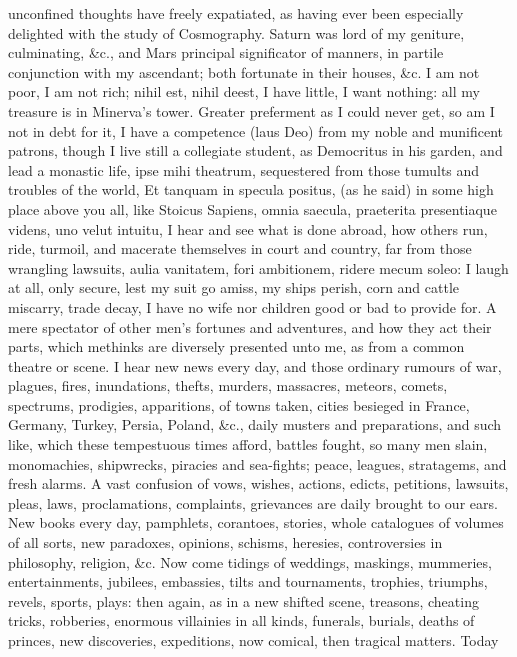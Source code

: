 {unconfined thoughts have freely expatiated, as having ever been
especially delighted with the study of Cosmography. Saturn was lord
of my geniture, culminating, \&c., and Mars principal significator of
manners, in partile conjunction with my ascendant; both fortunate in
their houses, \&c. I am not poor, I am not rich; nihil est, nihil deest,
I have little, I want nothing: all my treasure is in Minerva's tower.
Greater preferment as I could never get, so am I not in debt for it, I
have a competence (laus Deo) from my noble and munificent patrons,
though I live still a collegiate student, as Democritus in his garden,
and lead a monastic life, ipse mihi theatrum, sequestered from those
tumults and troubles of the world, Et tanquam in specula positus,
(as he said) in some high place above you all, like Stoicus
Sapiens, omnia saecula, praeterita presentiaque videns, uno velut
intuitu, I hear and see what is done abroad, how others run, ride,
turmoil, and macerate themselves in court and country, far from those
wrangling lawsuits, aulia vanitatem, fori ambitionem, ridere mecum
soleo: I laugh at all, only secure, lest my suit go amiss, my ships
perish, corn and cattle miscarry, trade decay, I have no wife nor
children good or bad to provide for. A mere spectator of other men's
fortunes and adventures, and how they act their parts, which methinks
are diversely presented unto me, as from a common theatre or scene. I
hear new news every day, and those ordinary rumours of war, plagues,
fires, inundations, thefts, murders, massacres, meteors, comets,
spectrums, prodigies, apparitions, of towns taken, cities besieged in
France, Germany, Turkey, Persia, Poland, \&c., daily musters and
preparations, and such like, which these tempestuous times afford,
battles fought, so many men slain, monomachies, shipwrecks, piracies
and sea-fights; peace, leagues, stratagems, and fresh alarms. A vast
confusion of vows, wishes, actions, edicts, petitions, lawsuits, pleas,
laws, proclamations, complaints, grievances are daily brought to our
ears. New books every day, pamphlets, corantoes, stories, whole
catalogues of volumes of all sorts, new paradoxes, opinions, schisms,
heresies, controversies in philosophy, religion, \&c. Now come tidings
of weddings, maskings, mummeries, entertainments, jubilees, embassies,
tilts and tournaments, trophies, triumphs, revels, sports, plays: then
again, as in a new shifted scene, treasons, cheating tricks, robberies,
enormous villainies in all kinds, funerals, burials, deaths of princes,
new discoveries, expeditions, now comical, then tragical matters. Today
}
